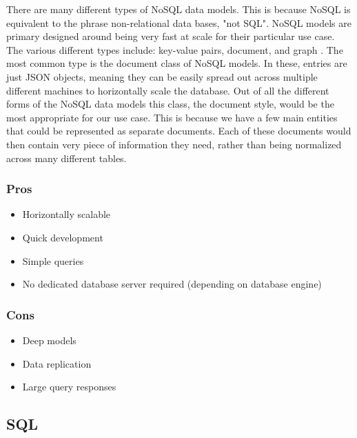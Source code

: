 \documentclass[draftclsnofoot,onecolumn,journal,letterpaper,compsoc,10pt]{IEEEtran}
\begin{document}
        There are many different types of NoSQL data models.  This is because NoSQL is equivalent to the phrase non-relational data bases, "not SQL".  NoSQL models are primary designed around being very fast at scale for their particular use case.  The various different types include: key-value pairs, document, and graph \cite{amazon_nosql}.  The most common type is the document class of NoSQL models.  In these, entries are just JSON objects, meaning they can be easily spread out across multiple different machines to horizontally scale the database.  Out of all the different forms of the NoSQL data models this class, the document style, would be the most appropriate for our use case.  This is because we have a few main entities that could be represented as separate documents.  Each of these documents would then contain very piece of information they need, rather than being normalized across many different tables.
        
        \subsubsection{Pros}
        
        \begin{itemize}
            \item Horizontally scalable
            \item Quick development
            \item Simple queries
            \item No dedicated database server required (depending on database engine)
        \end{itemize}
        
        \subsubsection{Cons}
        
        \begin{itemize}
            \item Deep models
            \item Data replication
            \item Large query responses
        \end{itemize}
    
    \subsection{SQL}
    
\end{document}
